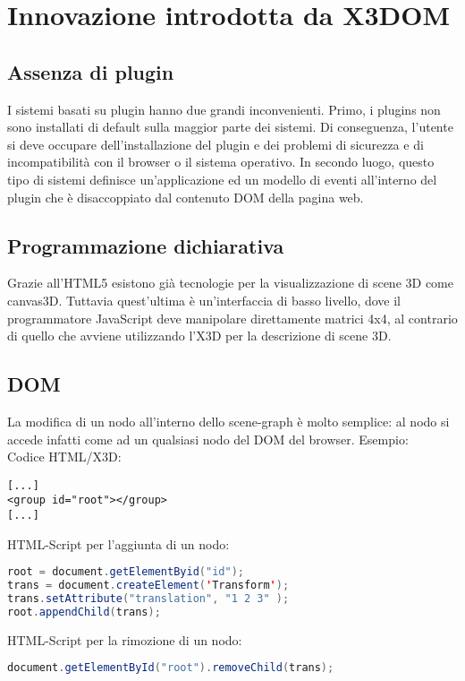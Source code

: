 \section{Innovazione introdotta da X3DOM}
\subsection{Assenza di plugin}
I sistemi basati su plugin hanno due grandi inconvenienti. Primo, i plugins non sono installati di default sulla 
maggior parte dei sistemi. Di conseguenza, l'utente si deve occupare dell'installazione del plugin e dei problemi di sicurezza e di 
incompatibilità con il browser o il sistema operativo. In secondo luogo, questo tipo di sistemi definisce un'applicazione ed un modello 
di eventi all'interno del plugin che è disaccoppiato dal contenuto DOM della pagina web.
\subsection{Programmazione dichiarativa}
Grazie all'HTML5 esistono già tecnologie per la visualizzazione di scene 3D come canvas3D. Tuttavia quest'ultima è un'interfaccia di 
basso livello, dove il programmatore JavaScript deve manipolare direttamente matrici 4x4, al contrario di quello che avviene utilizzando 
l'X3D per la descrizione di scene 3D.
\subsection{DOM}
La modifica di un nodo all'interno dello scene-graph è molto semplice: al nodo si accede infatti come ad un qualsiasi nodo del 
DOM del browser. Esempio:\\
Codice HTML/X3D:
\lstset{language=HTML}
\begin{lstlisting}
[...]
<group id="root"></group>
[...]
\end{lstlisting}
HTML-Script per l'aggiunta di un nodo:
\begin{lstlisting}[language=Java]
root = document.getElementByid("id");
trans = document.createElement('Transform');
trans.setAttribute("translation", "1 2 3" );
root.appendChild(trans);
\end{lstlisting}
HTML-Script per la rimozione di un nodo:
\begin{lstlisting}[language=Java]
document.getElementById("root").removeChild(trans);
\end{lstlisting}
